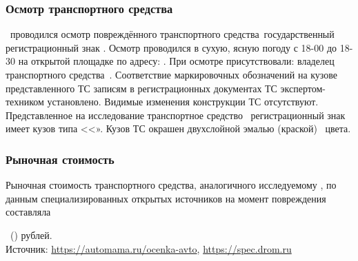 	
%
	
\vspace{3mm}
%
%


	\subsubsection{Осмотр транспортного средства}
	
   \osm\,  проводился осмотр повреждённого транспортного средства \tc\,государственный регистрационный знак \grz. Осмотр проводился в сухую, ясную погоду с 18-00  до 18-30 на открытой площадке   по адресу: . При осмотре присутствовали:  владелец транспортного средства  \,.  Соответствие маркировочных обозначений на кузове представленного ТС записям в регистрационных документах ТС экспертом-техником установлено. Видимые изменения конструкции ТС отсутствуют. Представленное на исследование транспортное средство \, регистрационный знак \, имеет кузов типа <<». Кузов ТС окрашен двухслойной   %
   эмалью (краской)  \colr \, цвета.
   

\subsubsection{Рыночная стоимость}
Рыночная стоимость  транспортного средства, аналогичного исследуемому , по данным специализированных открытых источников на момент повреждения  составляла 

 \,  (\!\!) рублей.\\
Источник:  \url{https://automama.ru/ocenka-avto}, \url{https://spec.drom.ru}


